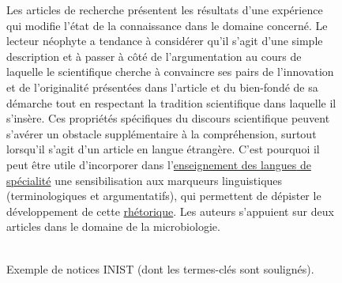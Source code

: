 \begin{figure}[t]
{{          Les articles de recherche présentent les résultats d'une expérience
          qui modifie l'état de la connaissance dans le domaine concerné. Le
          lecteur néophyte a tendance à considérer qu'il s'agit d'une simple
          description et à passer à côté de l'argumentation au cours de laquelle
          le scientifique cherche à convaincre ses pairs de l'innovation et de
          l'originalité présentées dans l'article et du bien-fondé de sa
          démarche tout en respectant la tradition scientifique dans laquelle il
          s'insère. Ces propriétés spécifiques du discours scientifique peuvent
          s'avérer un obstacle supplémentaire à la compréhension, surtout
          lorsqu'il s'agit d'un article en langue étrangère. C'est pourquoi il
          peut être utile d'incorporer dans l'\underline{enseignement des }
          \underline{\underline{langues} de spécialité} une sensibilisation aux
          marqueurs linguistiques (terminologiques et argumentatifs), qui
          permettent de dépister le développement de cette
          \underline{rhétorique}. Les auteurs s'appuient sur deux articles dans
          le domaine de la microbiologie.
        }
      }
    ~\\~\\
    \caption{Exemple de notices INIST (dont les termes-clés sont soulignés).
             \label{fig:exemple_notice_inist}}
  \end{figure}
  \addtocounter{footnote}{-2}
  \addtocounter{footnote}{1}
  \addtocounter{footnote}{1}

